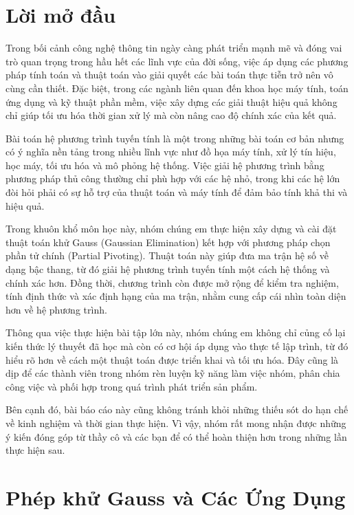 \documentclass[a4paper,12pt]{report}
\begin{document}
\chapter*{Lời mở đầu}
Trong bối cảnh công nghệ thông tin ngày càng phát triển mạnh mẽ và đóng vai trò quan trọng trong hầu hết các lĩnh vực của đời sống, việc áp dụng các phương pháp tính toán và thuật toán vào giải quyết các bài toán thực tiễn trở nên vô cùng cần thiết. Đặc biệt, trong các ngành liên quan đến khoa học máy tính, toán ứng dụng và kỹ thuật phần mềm, việc xây dựng các giải thuật hiệu quả không chỉ giúp tối ưu hóa thời gian xử lý mà còn nâng cao độ chính xác của kết quả.

\medskip

Bài toán hệ phương trình tuyến tính là một trong những bài toán cơ bản nhưng có ý nghĩa nền tảng trong nhiều lĩnh vực như đồ họa máy tính, xử lý tín hiệu, học máy, tối ưu hóa và mô phỏng hệ thống. Việc giải hệ phương trình bằng phương pháp thủ công thường chỉ phù hợp với các hệ nhỏ, trong khi các hệ lớn đòi hỏi phải có sự hỗ trợ của thuật toán và máy tính để đảm bảo tính khả thi và hiệu quả.

\medskip

Trong khuôn khổ môn học này, nhóm chúng em thực hiện xây dựng và cài đặt thuật toán khử Gauss (Gaussian Elimination) kết hợp với phương pháp chọn phần tử chính (Partial Pivoting). Thuật toán này giúp đưa ma trận hệ số về dạng bậc thang, từ đó giải hệ phương trình tuyến tính một cách hệ thống và chính xác hơn. Đồng thời, chương trình còn được mở rộng để kiểm tra nghiệm, tính định thức và xác định hạng của ma trận, nhằm cung cấp cái nhìn toàn diện hơn về hệ phương trình.

\medskip

Thông qua việc thực hiện bài tập lớn này, nhóm chúng em không chỉ củng cố lại kiến thức lý thuyết đã học mà còn có cơ hội áp dụng vào thực tế lập trình, từ đó hiểu rõ hơn về cách một thuật toán được triển khai và tối ưu hóa. Đây cũng là dịp để các thành viên trong nhóm rèn luyện kỹ năng làm việc nhóm, phân chia công việc và phối hợp trong quá trình phát triển sản phẩm.

\medskip

Bên cạnh đó, bài báo cáo này cũng không tránh khỏi những thiếu sót do hạn chế về kinh nghiệm và thời gian thực hiện. Vì vậy, nhóm rất mong nhận được những ý kiến đóng góp từ thầy cô và các bạn để có thể hoàn thiện hơn trong những lần thực hiện sau.

\chapter{Phép khử Gauss và Các Ứng Dụng}
\end{document}
